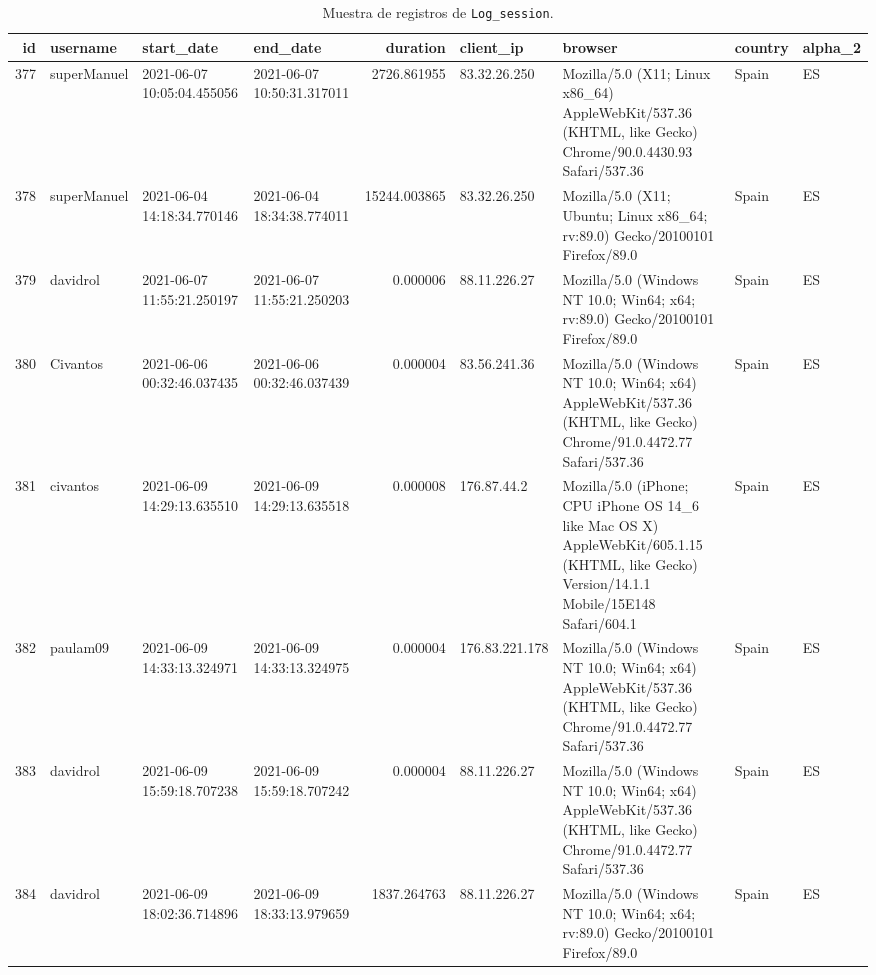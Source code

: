 \documentclass[a4paper, 12pt]{book}
\begin{document}
\begin{table}[!htb]
\centering
\caption{Muestra de registros de \texttt{Log\_session}.}
\label{tbl:log_session_sample}
\begin{tabular}{r l l l r l l l l}
\toprule
\textbf{id} & \textbf{username} & \textbf{start\_date} & \textbf{end\_date} & \textbf{duration} & \textbf{client\_ip} & \textbf{browser} & \textbf{country} & \textbf{alpha\_2} \\
\midrule
377 & superManuel & 2021-06-07 10:05:04.455056 & 2021-06-07 10:50:31.317011 & 2726.861955 & 83.32.26.250 & Mozilla/5.0 (X11; Linux x86\_64) AppleWebKit/537.36 (KHTML, like Gecko) Chrome/90.0.4430.93 Safari/537.36               & Spain & ES \\
378 & superManuel & 2021-06-04 14:18:34.770146 & 2021-06-04 18:34:38.774011 & 15244.003865 & 83.32.26.250 & Mozilla/5.0 (X11; Ubuntu; Linux x86\_64; rv:89.0) Gecko/20100101 Firefox/89.0                                   & Spain & ES \\
379 & davidrol    & 2021-06-07 11:55:21.250197 & 2021-06-07 11:55:21.250203 &    0.000006 & 88.11.226.27 & Mozilla/5.0 (Windows NT 10.0; Win64; x64; rv:89.0) Gecko/20100101 Firefox/89.0                                & Spain & ES \\
380 & Civantos    & 2021-06-06 00:32:46.037435 & 2021-06-06 00:32:46.037439 &    0.000004 & 83.56.241.36 & Mozilla/5.0 (Windows NT 10.0; Win64; x64) AppleWebKit/537.36 (KHTML, like Gecko) Chrome/91.0.4472.77 Safari/537.36 & Spain & ES \\
381 & civantos    & 2021-06-09 14:29:13.635510 & 2021-06-09 14:29:13.635518 &    0.000008 & 176.87.44.2  & Mozilla/5.0 (iPhone; CPU iPhone OS 14\_6 like Mac OS X) AppleWebKit/605.1.15 (KHTML, like Gecko) Version/14.1.1 Mobile/15E148 Safari/604.1 & Spain & ES \\
382 & paulam09    & 2021-06-09 14:33:13.324971 & 2021-06-09 14:33:13.324975 &    0.000004 & 176.83.221.178 & Mozilla/5.0 (Windows NT 10.0; Win64; x64) AppleWebKit/537.36 (KHTML, like Gecko) Chrome/91.0.4472.77 Safari/537.36 & Spain & ES \\
383 & davidrol    & 2021-06-09 15:59:18.707238 & 2021-06-09 15:59:18.707242 &    0.000004 & 88.11.226.27 & Mozilla/5.0 (Windows NT 10.0; Win64; x64) AppleWebKit/537.36 (KHTML, like Gecko) Chrome/91.0.4472.77 Safari/537.36 & Spain & ES \\
384 & davidrol    & 2021-06-09 18:02:36.714896 & 2021-06-09 18:33:13.979659 & 1837.264763 & 88.11.226.27 & Mozilla/5.0 (Windows NT 10.0; Win64; x64; rv:89.0) Gecko/20100101 Firefox/89.0                                & Spain & ES \\

\end{tabular}
\end{table}
\end{document}
